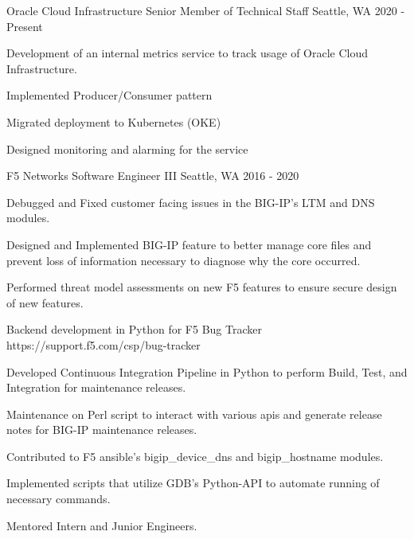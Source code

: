 

\begin{cventries}

\cventry
{Oracle Cloud Infrastructure} %
{Senior Member of Technical Staff} %
{Seattle, WA} %
{2020 - Present} %
{
  \begin{cvitems} %
    \item {Development of an internal metrics service to track usage of Oracle Cloud Infrastructure.}
    \item {Implemented Producer/Consumer pattern}
    \item {Migrated deployment to Kubernetes (OKE)}
    \item {Designed monitoring and alarming for the service}
  \end{cvitems}
}

  \cventry
    {F5 Networks} %
    {Software Engineer III} %
    {Seattle, WA} %
    {2016 - 2020} %
    {
      \begin{cvitems} %
        \item {Debugged and Fixed customer facing issues in the BIG-IP's LTM and DNS modules.}
        \item {Designed and Implemented BIG-IP feature to better manage core files and prevent loss of information necessary to diagnose why the core occurred.}
        \item {Performed threat model assessments on new F5 features to ensure secure design of new features.}
        \item {Backend development in Python for F5 Bug Tracker https://support.f5.com/csp/bug-tracker}
        \item {Developed Continuous Integration Pipeline in Python to perform Build, Test, and Integration for maintenance releases.}
        \item {Maintenance on Perl script to interact with various apis and generate release notes for BIG-IP maintenance releases.}
        \item {Contributed to F5 ansible's bigip\_device\_dns and bigip\_hostname modules.}
        \item {Implemented scripts that utilize GDB's Python-API to automate running of necessary commands.}
        \item {Mentored Intern and Junior Engineers.}
      \end{cvitems}
    }


\end{cventries}
